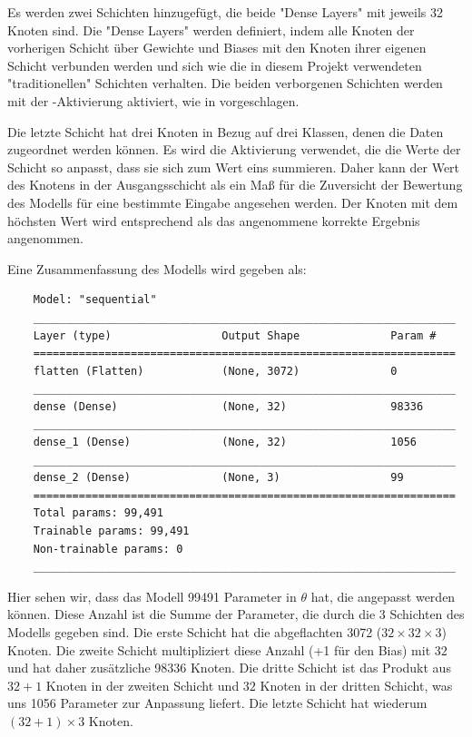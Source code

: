 Es werden zwei Schichten hinzugefügt, die beide "Dense Layers" mit jeweils 32 Knoten sind.
Die "Dense Layers" werden definiert, indem alle Knoten der vorherigen Schicht über Gewichte und Biases mit den Knoten ihrer eigenen Schicht verbunden werden und sich wie die in diesem Projekt verwendeten "traditionellen" Schichten verhalten.
Die beiden verborgenen Schichten werden mit der -Aktivierung aktiviert, wie in \cite[S.168]{Goodfellow2017} vorgeschlagen.

Die letzte Schicht hat drei Knoten in Bezug auf drei Klassen, denen die Daten zugeordnet werden können.
Es wird die Aktivierung  verwendet, die die Werte der Schicht so anpasst, dass sie sich zum Wert eins summieren.
Daher kann der Wert des Knotens in der Ausgangsschicht als ein Maß für die Zuversicht der Bewertung des Modells für eine bestimmte Eingabe angesehen werden.
Der Knoten mit dem höchsten Wert wird entsprechend als das angenommene korrekte Ergebnis angenommen.

Eine Zusammenfassung des Modells wird gegeben als:

\begin{lstlisting}
    Model: "sequential"
    _________________________________________________________________
    Layer (type)                 Output Shape              Param #   
    =================================================================
    flatten (Flatten)            (None, 3072)              0         
    _________________________________________________________________
    dense (Dense)                (None, 32)                98336     
    _________________________________________________________________
    dense_1 (Dense)              (None, 32)                1056      
    _________________________________________________________________
    dense_2 (Dense)              (None, 3)                 99        
    =================================================================
    Total params: 99,491
    Trainable params: 99,491
    Non-trainable params: 0
    _________________________________________________________________
\end{lstlisting}

Hier sehen wir, dass das Modell 99491 Parameter in $\theta$ hat, die angepasst werden können.
Diese Anzahl ist die Summe der Parameter, die durch die 3 Schichten des Modells gegeben sind.
Die erste Schicht hat die abgeflachten 3072 ($32 \times 32 \times 3$) Knoten.
Die zweite Schicht multipliziert diese Anzahl (+1 für den Bias) mit $32$ und hat daher zusätzliche 98336 Knoten.
Die dritte Schicht ist das Produkt aus $32 + 1$ Knoten in der zweiten Schicht und $32$ Knoten in der dritten Schicht, was uns 1056 Parameter zur Anpassung liefert.
Die letzte Schicht hat wiederum $(32 + 1) \times 3$ Knoten.

